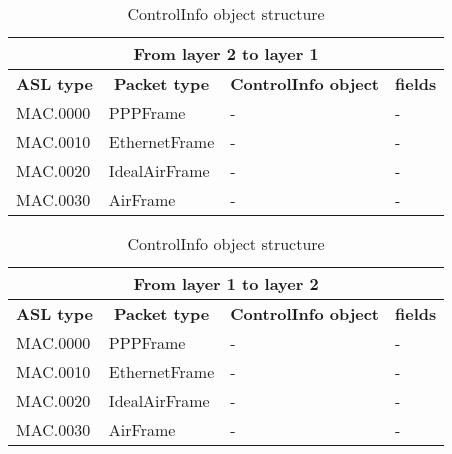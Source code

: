 \begin{table} [ppp]
\centering
\ttfamily
\footnotesize
\caption{ControlInfo object structure}
\label{tab:from2-to1}
\begin{tabular}{|l|l|l|l|}
\hline
\multicolumn{4}{|c|}{\normalfont\textbf{From layer 2 to layer 1}}	\\
\hline
\multicolumn{1}{|c|}{\normalfont\textbf{ASL type}}	&\multicolumn{1}{c|}{\normalfont\textbf{Packet type}}		&\multicolumn{1}{c|}{\normalfont\textbf{ControlInfo object}}		&\multicolumn{1}{c|}{\normalfont\textbf{fields}}\\
\hline
\multirow{1}{*}{MAC.0000}&\multirow{1}{*}{PPPFrame}		&-	&-	\\
\hline
\multirow{1}{*}{MAC.0010}&\multirow{1}{*}{EthernetFrame}	&-	&-	\\
\hline
\multirow{1}{*}{MAC.0020}&\multirow{1}{*}{IdealAirFrame}		&-	&-	\\
\hline
\multirow{1}{*}{MAC.0030}&\multirow{1}{*}{AirFrame}		&-	&-	\\
\hline
\end{tabular}
\end{table}
%
\begin{table}[ppp]
\centering
\ttfamily
\footnotesize
\caption{ControlInfo object structure}
\label{tab:from1-to2}
\begin{tabular}{|l|l|l|l|}
\hline
\multicolumn{4}{|c|}{\normalfont\textbf{From layer 1 to layer 2}}	\\
\hline
\multicolumn{1}{|c|}{\normalfont\textbf{ASL type}}	&\multicolumn{1}{c|}{\normalfont\textbf{Packet type}}		&\multicolumn{1}{c|}{\normalfont\textbf{ControlInfo object}}		&\multicolumn{1}{c|}{\normalfont\textbf{fields}}\\
\hline
\multirow{1}{*}{MAC.0000}&\multirow{1}{*}{PPPFrame}		&-	&-	\\
\hline
\multirow{1}{*}{MAC.0010}&\multirow{1}{*}{EthernetFrame}	&-	&-	\\
\hline
\multirow{1}{*}{MAC.0020}&\multirow{1}{*}{IdealAirFrame}		&-	&-	\\
\hline
\multirow{1}{*}{MAC.0030}&\multirow{1}{*}{AirFrame}		&-	&-	\\
\hline
\end{tabular}
\end{table}









